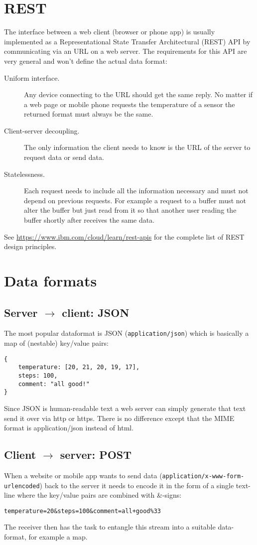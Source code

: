 \documentclass[12pt]{report}
\begin{document}
\section{REST}
The interface between a web client (browser or phone app) is usually
implemented as a Representational State Transfer Architectural (REST)
API by communicating via an URL on a web server. The requirements
for this API are very general and won't define the actual data format:
\begin{description}
\item[Uniform interface.] Any device connecting to the URL should
  get the same reply. No matter if a web page or mobile phone
  requests the temperature of a sensor the returned format must always be the same.
\item[Client-server decoupling.] The only information
  the client needs to know is the URL of the server to request data or send data.
\item[Statelessness.] Each request needs to include all the
  information necessary and must not depend on previous requests. For
  example a request to a buffer must not alter the
  buffer but just read from it so that another user reading the buffer
  shortly after receives the same data.
\end{description}
See \url{https://www.ibm.com/cloud/learn/rest-apis} for the complete
list of REST design principles.

\section{Data formats}
\subsection{Server $\to$ client: JSON}
The most popular dataformat is JSON (\texttt{application/json}) which
is basically a map of (nestable) key/value pairs:
\begin{verbatim}
{
    temperature: [20, 21, 20, 19, 17],
    steps: 100,
    comment: "all good!"
}
\end{verbatim}
Since JSON is human-readable text a web server can simply
generate that text send it over via http or https. There
is no difference except that the MIME format is \textquotesingle application/json\textquotesingle{}
instead of html.

\subsection{Client $\to$ server: POST}
When a website or mobile app wants to send data
(\texttt{application/x-www-form-urlencoded}) back to the server it needs to
encode it in the form of a single text-line where the key/value pairs
are combined with \&-signs:
\begin{verbatim}
temperature=20&steps=100&comment=all+good%33
\end{verbatim}
The receiver then has the task to entangle this stream into a suitable
data-format, for example a map.
\end{document}
